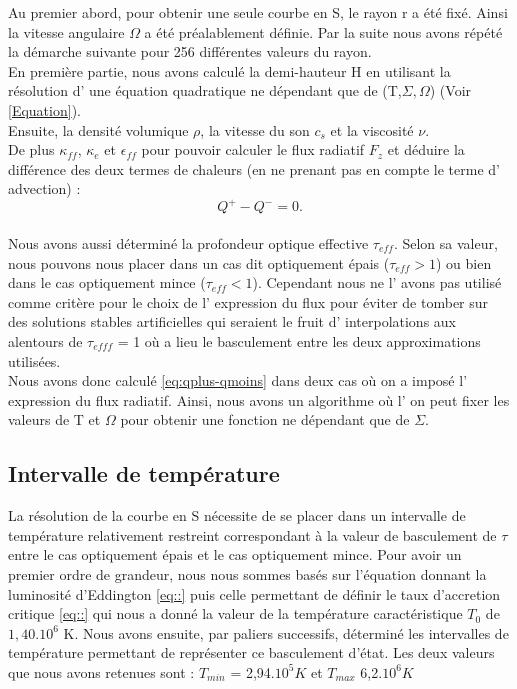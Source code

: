 Au premier abord, pour obtenir une seule courbe en S, le rayon r a été fixé. Ainsi la vitesse angulaire $\Omega$ a été préalablement définie. Par la suite nous avons répété la démarche suivante pour 256 différentes valeurs du rayon.
\\
En première partie, nous avons calculé la demi-hauteur H en utilisant la résolution d' une équation quadratique ne dépendant que de (T,$\Sigma,\Omega$) (Voir \ref{Equation}).
\\
Ensuite, la densité volumique $\rho$, la vitesse du son $c_s$ et la viscosité $\nu$. 
\\
De plus $\kappa_{ff}$, $\kappa_{e}$ et $\epsilon_{ff}$ pour pouvoir calculer le flux radiatif $F_z$ et déduire la différence des deux termes de chaleurs (en ne prenant pas en compte le terme d' advection) :
\\
\begin{equation} 
\label{eq:qplus-qmoins}
Q^+ - Q^- = 0. 
\end{equation}
\\
Nous avons aussi déterminé la profondeur optique effective $\tau_{eff}$. Selon sa valeur, nous pouvons nous placer dans un cas dit optiquement épais ($\tau_{eff} > 1$) ou bien dans le cas optiquement mince  ($\tau_{eff} < 1$).
Cependant nous ne l' avons pas utilisé comme critère pour le choix de l' expression du flux pour éviter de tomber sur des solutions stables artificielles qui seraient le fruit d' interpolations aux alentours de $\tau_{efff}$ = 1 où a lieu le basculement entre les deux approximations utilisées. 
\\
Nous avons donc calculé \ref{eq:qplus-qmoins} dans deux cas où on a imposé l' expression du flux radiatif. Ainsi, nous avons un algorithme où l' on peut fixer les valeurs de T et $\Omega$ pour obtenir une fonction ne dépendant que de $\Sigma$.

\subsection{Intervalle de température}
La résolution de la courbe en S nécessite de se placer dans un intervalle de température relativement restreint correspondant à la valeur de basculement de $\tau$ entre le cas optiquement épais et le cas optiquement mince.
Pour avoir un premier ordre de grandeur, nous nous sommes basés sur l'équation donnant la luminosité d'Eddington \ref{eq::} puis celle permettant de définir le taux d'accretion critique \ref{eq::} qui nous a donné la valeur de la température caractéristique $T_0$ de $1,40.10^6$ K. Nous avons ensuite, par paliers successifs, déterminé les intervalles de température permettant de représenter ce basculement d'état. Les deux valeurs que nous avons retenues sont : $T_{min}$ = 2,94.$10^5 K$ et $T_{max}$ 6,2.$10^6 K$ 
\\


